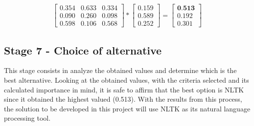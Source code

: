 \begin{gather}
    \begin{bmatrix}
        0.354 & 0.633 & 0.334 \\
        0.090 & 0.260 & 0.098 \\
        0.598 & 0.106 & 0.568
    \end{bmatrix}
    *
    \begin{bmatrix}
      0.159 \\
      0.589 \\
      0.252
    \end{bmatrix}
      =
    \begin{bmatrix}
      \textbf{0.513} \\
      0.192 \\
      0.301
    \end{bmatrix}
\end{gather}

\subsection{Stage 7 - Choice of alternative}

This stage consists in analyze the obtained values and determine which is the best alternative.
Looking at the obtained values, with the criteria selected and its calculated importance in mind, it is safe to affirm that the best option is NLTK since it obtained the highest valued (0.513).
With the results from this process, the solution to be developed in this project will use NLTK as its natural language processing tool.
